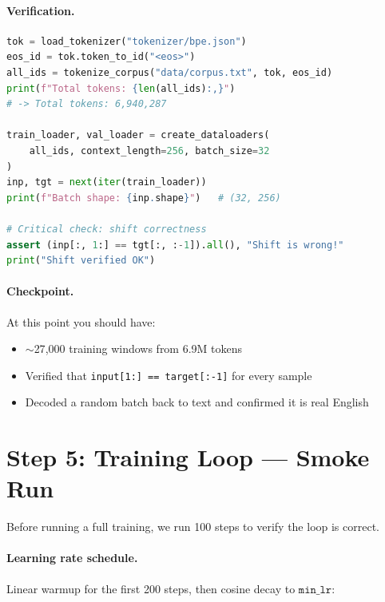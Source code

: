 \paragraph{Verification.}

\begin{lstlisting}[language=python, caption={Data pipeline verification}]
tok = load_tokenizer("tokenizer/bpe.json")
eos_id = tok.token_to_id("<eos>")
all_ids = tokenize_corpus("data/corpus.txt", tok, eos_id)
print(f"Total tokens: {len(all_ids):,}")
# -> Total tokens: 6,940,287

train_loader, val_loader = create_dataloaders(
    all_ids, context_length=256, batch_size=32
)
inp, tgt = next(iter(train_loader))
print(f"Batch shape: {inp.shape}")   # (32, 256)

# Critical check: shift correctness
assert (inp[:, 1:] == tgt[:, :-1]).all(), "Shift is wrong!"
print("Shift verified OK")
\end{lstlisting}

\paragraph{Checkpoint.}
At this point you should have:
\begin{itemize}[nosep]
  \item $\sim$27{,}000 training windows from 6.9M tokens
  \item Verified that \texttt{input[1:] == target[:-1]} for every sample
  \item Decoded a random batch back to text and confirmed it is real English
\end{itemize}


\section{Step 5: Training Loop --- Smoke Run}
\label{sec:guide-smoke}

Before running a full training, we run 100 steps to verify the loop is correct.

\paragraph{Learning rate schedule.}

Linear warmup for the first 200 steps, then cosine decay to $\texttt{min\_lr}$:

